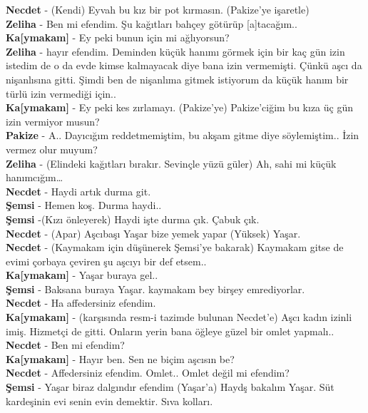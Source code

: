 \documentclass[]{book}
\begin{document}
\textbf{Necdet} - (Kendi) Eyvah bu kız bir pot kırmasın. (Pakize'ye işaretle)\\
\textbf{Zeliha} - Ben mi efendim. Şu kağıtları bahçey götürüp {[}a{]}tacağım..\\
\textbf{Ka{[}ymakam{]}} - Ey peki bunun için mi ağlıyorsun?\\
\textbf{Zeliha} - hayır efendim. Deminden küçük hanımı görmek için bir kaç gün izin istedim de o da evde kimse kalmayacak diye bana izin vermemişti. Çünkü aşcı da nişanlısına gitti. Şimdi ben de nişanlıma gitmek istiyorum da küçük hanım bir türlü izin vermediği için..\\
\textbf{Ka{[}ymakam{]}} - Ey peki kes zırlamayı. (Pakize'ye) Pakize'ciğim bu kıza üç gün izin vermiyor musun?\\
\textbf{Pakize} - A.. Dayıcığım reddetmemiştim, bu akşam gitme diye söylemiştim.. İzin vermez olur muyum?\\
\textbf{Zeliha} - (Elindeki kağıtları bırakır. Sevinçle yüzü güler) Ah, sahi mi küçük hanımcığım\ldots{}\\
\textbf{Necdet} - Haydi artık durma git.\\
\textbf{Şemsi} - Hemen koş. Durma haydi..\\
\textbf{Şemsi} -(Kızı önleyerek) Haydi işte durma çık. Çabuk çık.\\
\textbf{Necdet} - (Apar) Aşcıbaşı Yaşar bize yemek yapar (Yüksek) Yaşar.\\
\textbf{Necdet} - (Kaymakam için düşünerek Şemsi'ye bakarak) Kaymakam gitse de evimi çorbaya çeviren şu aşcıyı bir def etsem..\\
\textbf{Ka{[}ymakam{]}} - Yaşar buraya gel..\\
\textbf{Şemsi} - Baksana buraya Yaşar. kaymakam bey birşey emrediyorlar.\\
\textbf{Necdet} - Ha affedersiniz efendim.\\
\textbf{Ka{[}ymakam{]}} - (karşısında resm-i tazimde bulunan Necdet'e) Aşcı kadın izinli imiş. Hizmetçi de gitti. Onların yerin bana öğleye güzel bir omlet yapmalı..\\
\textbf{Necdet} - Ben mi efendim?\\
\textbf{Ka{[}ymakam{]}} - Hayır ben. Sen ne biçim aşcısın be?\\
\textbf{Necdet} - Affedersiniz
efendim. Omlet.. Omlet değil mi efendim?\\
\textbf{Şemsi} - Yaşar biraz dalgındır efendim (Yaşar'a) Haydş bakalım Yaşar. Süt kardeşinin evi senin evin demektir. Sıva kolları.\\
\end{document}
